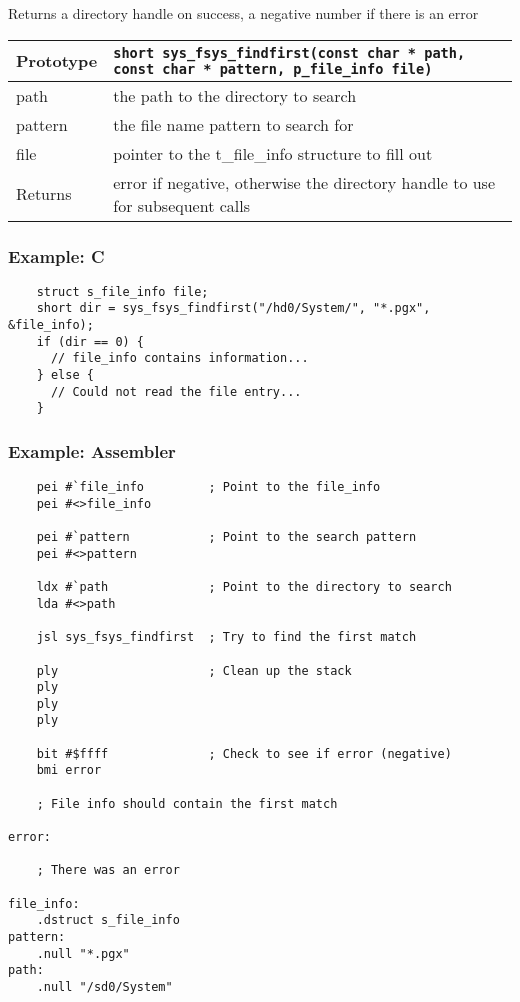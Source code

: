 Returns a directory handle on success, a negative number if there is an error

\bigskip

\begin{tabular}{|l||l|} \hline
Prototype & \lstinline!short sys_fsys_findfirst(const char * path, const char * pattern, p_file_info file)! \\ \hline
path & the path to the directory to search \\ \hline
pattern & the file name pattern to search for \\ \hline
file & pointer to the t\_file\_info structure to fill out \\ \hline
Returns & error if negative, otherwise the directory handle to use for subsequent calls \\ \hline
\end{tabular}

\subsubsection*{Example: C}
\begin{lstlisting}
    struct s_file_info file;
    short dir = sys_fsys_findfirst("/hd0/System/", "*.pgx", &file_info);
    if (dir == 0) {
      // file_info contains information...
    } else {
      // Could not read the file entry...
    }
\end{lstlisting}

\subsubsection*{Example: Assembler}
\begin{verbatim}
    pei #`file_info         ; Point to the file_info 
    pei #<>file_info

    pei #`pattern           ; Point to the search pattern
    pei #<>pattern

    ldx #`path              ; Point to the directory to search
    lda #<>path

    jsl sys_fsys_findfirst  ; Try to find the first match

    ply                     ; Clean up the stack
    ply
    ply
    ply

    bit #$ffff              ; Check to see if error (negative)
    bmi error

    ; File info should contain the first match

error:

    ; There was an error

file_info:
    .dstruct s_file_info
pattern:
    .null "*.pgx"
path:
    .null "/sd0/System"
\end{verbatim}


